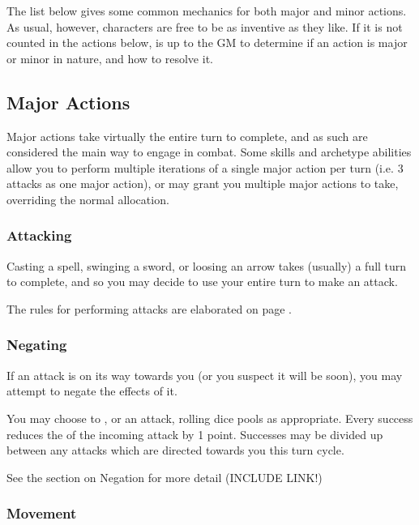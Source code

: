  The list below gives some common mechanics for both major and minor actions. As usual, however, characters are free to be as inventive as they like. If it is not counted in the actions below, is up to the GM to determine if an action is major or minor in nature, and how to resolve it. 
 
 \subsection{Major Actions}
 
 Major actions take virtually the entire turn to complete, and as such are considered the main way to engage in combat. Some skills and archetype abilities allow you to perform multiple iterations of a single major action per turn (i.e. 3 attacks as one major action), or may grant you multiple major actions to take, overriding the normal allocation. 
 
 \subsubsection{Attacking}
 
 Casting a spell, swinging a sword, or loosing an arrow takes (usually) a full turn to complete, and so you may decide to use your entire turn to make an attack.
 
The rules for performing attacks are elaborated on page \pageref{S:Attacks}.


	\subsubsection{Negating}    
	
	If an attack is on its way towards you (or you suspect it will be soon), you may attempt to negate the effects of it. 
	
	You may choose to ,  or  an attack, rolling dice pools as appropriate. Every success reduces the  of the incoming attack by 1 point. Successes may be divided up between any attacks which are directed towards you this turn cycle. 
	
	See the section on Negation for more detail (INCLUDE LINK!)
	
 \subsubsection{Movement}
 
